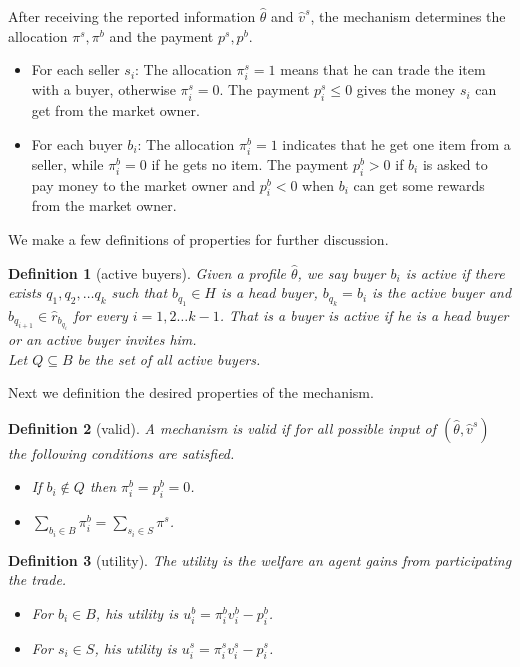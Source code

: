 \documentclass[format=acmsmall, review=false, natbib=false]{acmart}
\newtheorem{definition}{Definition}[section]
\begin{document}
After receiving the reported information $\hat\theta$ and $\hat v^s$, the mechanism determines the allocation $\pi^s,\pi^b$ and the payment $p^s,p^b$.
\begin{itemize}
	\item For each seller $s_i$:
	      The allocation $\pi^s_i = 1$ means that he can trade the item with a buyer, otherwise $\pi^s_i = 0$.
	      The payment $p^s_i\leq 0$ gives the money $s_i$ can get from the market owner.
	\item For each buyer $b_i$:
	      The allocation $\pi^b_i = 1$ indicates that he get one item from a seller, while $\pi^b_i=0$ if he gets no item.
	      The payment $p^b_i>0$ if $b_i$ is asked to pay money to the market owner
	      and $p^b_i<0$ when $b_i$ can get some rewards from the market owner.
\end{itemize}


We make a few definitions of properties for further discussion.

\begin{definition}[active buyers]
	Given a profile $\hat\theta$, we say buyer $b_i$ is active
	if there exists $q_1,q_2,\ldots q_k$ such that
	$b_{q_1}\in H$ is a head buyer, $b_{q_k}=b_i$ is the active buyer and
	$b_{q_{i+1}} \in \hat r_{b_{q_i}}$ for every $i=1,2\ldots k-1$.
	That is a buyer is active if he is a head buyer or an active buyer invites him.\\
	Let $Q\subseteq B$ be the set of all active buyers.
\end{definition}

Next we definition the desired properties of the mechanism.

\begin{definition}[valid]
	A mechanism is valid if for all possible input of $(\hat\theta,\hat v^s)$ the following conditions are satisfied.
	\begin{itemize}
		\item If $b_i\not\in Q$ then $\pi^b_i=p^b_i=0$.
		\item $\sum_{b_i\in B} \pi^b_i = \sum_{s_i\in S} \pi^s$.
	\end{itemize}
\end{definition}

\begin{definition}[utility]
	The utility is the welfare an agent gains from participating the trade.
	\begin{itemize}
		\item For $b_i\in B$, his utility is $u^b_i = \pi^b_i v^b_i-p^b_i$.
		\item For $s_i\in S$, his utility is $u^s_i = \pi^s_i v^s_i-p^s_i$.
	\end{itemize}
\end{definition}
\end{document}
